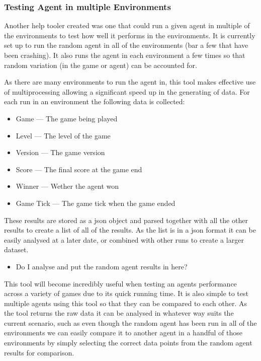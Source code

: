 \documentclass[a4paper]{article}
\begin{document}
\subsubsection{Testing Agent in multiple Environments}
Another help tooler created was one that could run a given agent in multiple of the environments to test how well it performs in the environments.
It is currently set up to run the random agent in all of the environments (bar a few that have been crashing).
It also runs the agent in each environment a few times so that random variation (in the game or agent) can be accounted for.
\par
As there are many environments to run the agent in, this tool makes effective use of multiprocessing allowing a significant speed up in the generating of data.
For each run in an environment the following data is collected:
\begin{multicols}{2}
    \begin{itemize}
        \item Game --- The game being played
        \item Level --- The level of the game
        \item Version --- The game version
        \item Score --- The final score at the game end
        \item Winner --- Wether the agent won
        \item Game Tick --- The game tick when the game ended
    \end{itemize}
\end{multicols}
These results are stored as a json object and parsed together with all the other results to create a list of all of the results.
As the list is in a json format it can be easily analysed at a later date, or combined with other runs to create a larger dataset.
\par
\begin{itemize}
    \item Do I analyse and put the random agent results in here?
\end{itemize}
\par
This tool will become incredibly useful when testing an agents performance across a variety of games due to its quick running time.
It is also simple to test multiple agents using this tool so that they can be compared to each other.
As the tool returns the raw data it can be analysed in whatever way suits the current scenario, such as even though the random agent has been run in all of the environments we can easily compare it to another agent in a handful of those environments by simply selecting the correct data points from the random agent results for comparison.
\end{document}
